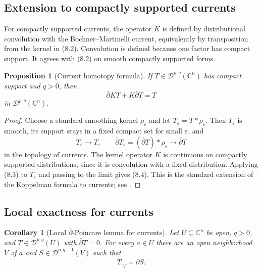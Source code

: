 \documentclass[11pt,a4paper]{article}
\newtheorem{proposition}[theorem]{Proposition}
\newtheorem{corollary}[theorem]{Corollary}
\theoremstyle{definition}
\theoremstyle{remark}
\newcommand{\C}{\mathbb C}
\newcommand{\Dcur}{\mathcal D}
\newcommand{\ddbar}{\bar\partial}
\begin{document}
\subsection{Extension to compactly supported currents}

For compactly supported currents, the operator $K$ is defined by distributional convolution with the Bochner--Martinelli current, equivalently by transposition from the kernel in (8.2). Convolution is defined because one factor has compact support. It agrees with (8.2) on smooth compactly supported forms.

\begin{proposition}[Current homotopy formula]
If $T\in\Dcur^{p,q}(\C^n)$ has compact support and $q>0$, then
\[
\ddbar KT+K\ddbar T=T
\tag{8.4}
\]
in $\Dcur^{p,q}(\C^n)$.
\end{proposition}

\begin{proof}
Choose a standard smoothing kernel $\rho_\varepsilon$ and let $T_\varepsilon=T*\rho_\varepsilon$. Then $T_\varepsilon$ is smooth, its support stays in a fixed compact set for small $\varepsilon$, and
\[
T_\varepsilon\to T,
\qquad
\ddbar T_\varepsilon=(\ddbar T)*\rho_\varepsilon\to\ddbar T
\]
in the topology of currents. The kernel operator $K$ is continuous on compactly supported distributions, since it is convolution with a fixed distribution. Applying (8.3) to $T_\varepsilon$ and passing to the limit gives (8.4). This is the standard extension of the Koppelman formula to currents; see \cite[Chapter I, \S3]{Demailly}.
\end{proof}

\subsection{Local exactness for currents}

\begin{corollary}[Local $\bar\partial$-Poincare lemma for currents]
Let $U\subseteq\C^n$ be open, $q>0$, and $T\in\Dcur^{p,q}(U)$ with $\ddbar T=0$. For every $a\in U$ there are an open neighborhood $V$ of $a$ and $S\in\Dcur^{p,q-1}(V)$ such that
\[
T|_V=\ddbar S.
\]
\end{corollary}
\end{document}
